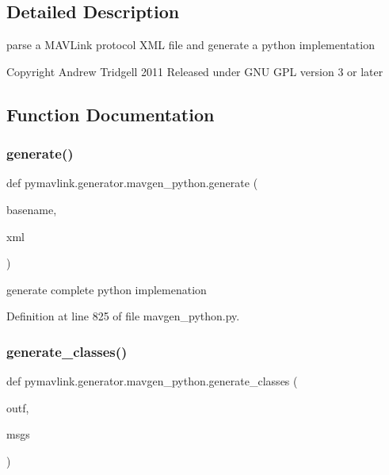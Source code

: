 \subsection{Detailed Description}
\begin{DoxyVerb}parse a MAVLink protocol XML file and generate a python implementation

Copyright Andrew Tridgell 2011
Released under GNU GPL version 3 or later
\end{DoxyVerb}
 

\subsection{Function Documentation}
\mbox{\label{namespacepymavlink_1_1generator_1_1mavgen__python_aca7b16b5ead8d9f4c5a03ed6996b4776}} 
\subsubsection{\texorpdfstring{generate()}{generate()}}
{\footnotesize\ttfamily def pymavlink.\+generator.\+mavgen\+\_\+python.\+generate (\begin{DoxyParamCaption}\item[{}]{basename,  }\item[{}]{xml }\end{DoxyParamCaption})}

\begin{DoxyVerb}generate complete python implemenation\end{DoxyVerb}
 

Definition at line 825 of file mavgen\+\_\+python.\+py.

\mbox{\label{namespacepymavlink_1_1generator_1_1mavgen__python_ac6dff0a7f2badc0a44428acc00c9801f}} 
\subsubsection{\texorpdfstring{generate\_classes()}{generate\_classes()}}
{\footnotesize\ttfamily def pymavlink.\+generator.\+mavgen\+\_\+python.\+generate\+\_\+classes (\begin{DoxyParamCaption}\item[{}]{outf,  }\item[{}]{msgs }\end{DoxyParamCaption})}



